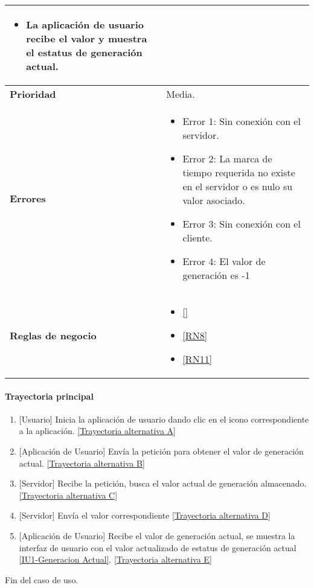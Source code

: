 \begin{longtable}{|J{5cm}|J{10.3cm}|}
\begin{itemize}
			\item La aplicación de usuario recibe el valor y muestra el estatus de generación actual.
		\end{itemize} \\ \hline 
	\textbf{Prioridad} & 
		Media. \\ \hline
	\textbf{Errores} & 
		\begin{itemize}
		    \item \label{CU13:Error1} Error 1: Sin conexión con el servidor.
			\item \label{CU13:Error2} Error 2: La marca de tiempo requerida no existe en el servidor o es nulo su valor asociado.
		    \item \label{CU13:Error3} Error 3: Sin conexión con el cliente.
		    \item \label{CU13:Error4} Error 4: El valor de generación es -1
		\end{itemize} \\ \hline
	\textbf{Reglas de negocio} & 
		\begin{itemize}
		    \item \ref{}
			\item \ref{RN8}
			\item \ref{RN11}
		\end{itemize} \\ \hline
\end{longtable}

\paragraph{Trayectoria principal}
    \label{SUB-U-CU1.13:TP}
	\begin{enumerate}
	    \item {[Usuario]} Inicia la aplicación de usuario dando clic en el icono correspondiente a la aplicación. \hyperref[SUB-U-CU1.13:TA]{[Trayectoria alternativa A]}
	    \item {[Aplicación de Usuario]} Envía la petición para obtener el valor de generación actual. \hyperref[SUB-U-CU1.13:TB]{[Trayectoria alternativa B]} 
	    \item {[Servidor]} Recibe la petición, busca el valor actual de generación almacenado. \hyperref[SUB-U-CU1.13:TC]{[Trayectoria alternativa C]}
	    \item {[Servidor]} Envía el valor correspondiente \hyperref[SUB-U-CU1.13:TD]{[Trayectoria alternativa D]} 
	    \item {[Aplicación de Usuario]} Recibe el valor de generación actual, se muestra la interfaz de usuario con el valor actualizado de estatus de generación actual \hyperref[fig:monitoreo]{[IU1-Generacion Actual]}. \hyperref[SUB-U-CU1.13:TE]{[Trayectoria alternativa E]}
	\end{enumerate}
	Fin del caso de uso.

